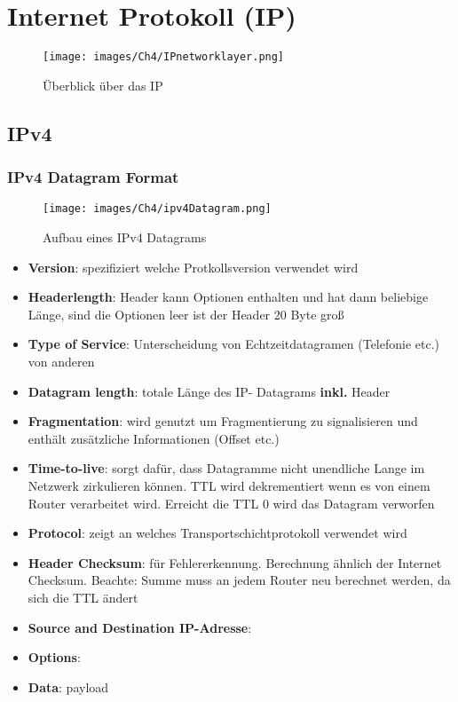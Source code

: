 \section{Internet Protokoll (IP)}

 \begin{figure}[H]
    \centering
    \texttt{[image: images/Ch4/IPnetworklayer.png]}
    \caption{Überblick über das IP}
    \label{Ch04-IPnetworklayer}
\end{figure}

\subsection{IPv4}
\subsubsection{IPv4 Datagram Format}
 \begin{figure}[H]
    \centering
    \texttt{[image: images/Ch4/ipv4Datagram.png]}
    \caption{Aufbau eines IPv4 Datagrams}
    \label{Ch04-ipv4}
\end{figure}

\begin{itemize}
    \item \textbf{Version}: spezifiziert welche Protkollsversion verwendet wird
    \item \textbf{Headerlength}: Header kann Optionen enthalten und hat dann beliebige Länge, sind die Optionen leer ist der Header 20 Byte groß
    \item \textbf{Type of Service}: Unterscheidung von Echtzeitdatagramen (Telefonie etc.) von anderen
    \item \textbf{Datagram length}: totale Länge des IP- Datagrams \textbf{inkl.} Header
    \item \textbf{Fragmentation}: wird genutzt um Fragmentierung zu signalisieren und enthält zusätzliche Informationen (Offset etc.)
    \item \textbf{Time-to-live}: sorgt dafür, dass Datagramme nicht unendliche Lange im Netzwerk zirkulieren können. TTL wird dekrementiert wenn es von einem Router verarbeitet wird. Erreicht die TTL 0 wird das Datagram verworfen
    \item \textbf{Protocol}: zeigt an welches Transportschichtprotokoll verwendet wird
    \item \textbf{Header Checksum}: für Fehlererkennung. Berechnung ähnlich der Internet Checksum. Beachte: Summe muss an jedem Router neu berechnet werden, da sich die TTL ändert
    \item \textbf{Source and Destination IP-Adresse}: 
    \item \textbf{Options}: 
    \item \textbf{Data}: payload
\end{itemize}

